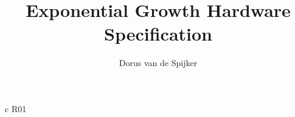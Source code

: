 \documentclass[a4paper]{prodrive/user_manual}
\title{Exponential Growth Hardware Specification}
\author{Dorus van de Spijker}
\begin{document}
\maketitle
\makedisclaimer

\begin{pddocumenthistory}
\end{pddocumenthistory}



\pagebreak

\begin{pddistributionlist}{c }          { R01 }
\end{pddistributionlist}



\begin{pdissues}
\end{pdissues}


\pdtableofcontents
\pdlistoffigures
\pdlistoftables
\pdlistoflistings


%


\pdappendix
%
%
%
%
%
%
%
%

%
%
\end{document}
